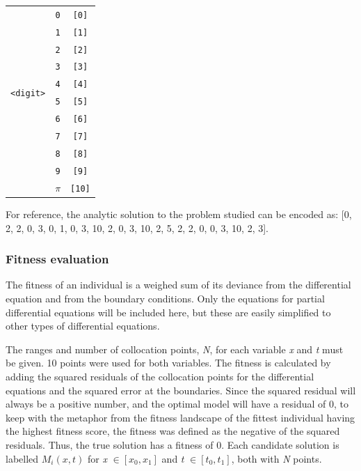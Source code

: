 \documentclass[multicolumn, 9pt]{extarticle}
\begin{document}
\begin{table}[h]
\begin{tabular}{ccc}
		\midrule

		\multirow{10}{*}{\texttt{<digit>}}
		     & \multicolumn{1}{c}{\texttt{0}}                  & \multicolumn{1}{c}{\texttt{[0]}}  \\
		     & \multicolumn{1}{c}{\texttt{1}}                  & \multicolumn{1}{c}{\texttt{[1]}}  \\
		     & \multicolumn{1}{c}{\texttt{2}}                  & \multicolumn{1}{c}{\texttt{[2]}}  \\
		     & \multicolumn{1}{c}{\texttt{3}}                  & \multicolumn{1}{c}{\texttt{[3]}}  \\
		     & \multicolumn{1}{c}{\texttt{4}}                  & \multicolumn{1}{c}{\texttt{[4]}}  \\
		     & \multicolumn{1}{c}{\texttt{5}}                  & \multicolumn{1}{c}{\texttt{[5]}}  \\
		     & \multicolumn{1}{c}{\texttt{6}}                  & \multicolumn{1}{c}{\texttt{[6]}}  \\
		     & \multicolumn{1}{c}{\texttt{7}}                  & \multicolumn{1}{c}{\texttt{[7]}}  \\
		     & \multicolumn{1}{c}{\texttt{8}}                  & \multicolumn{1}{c}{\texttt{[8]}}  \\
		     & \multicolumn{1}{c}{\texttt{9}}                  & \multicolumn{1}{c}{\texttt{[9]}}  \\
		     & \multicolumn{1}{c}{\texttt{$\pi$}}              & \multicolumn{1}{c}{\texttt{[10]}} \\

		\bottomrule
	\end{tabular}
\end{table}


For reference, the analytic solution to the problem studied can be encoded as: [0, 2, 2, 0, 3, 0, 1, 0, 3, 10, 2, 0, 3, 10, 2, 5, 2, 2, 0, 0, 3, 10, 2, 3].

\subsubsection{Fitness evaluation}
The fitness of an individual is a weighed sum of its deviance from the differential equation and from the boundary conditions. Only the equations for partial differential equations will be included here, but these are easily simplified to other types of differential equations.

The ranges and number of collocation points, \textit{N}, for each variable \textit{x} and \textit{t} must be given. 10 points were used for both variables. The fitness is calculated by adding the squared residuals of the collocation points for the differential equations and the squared error at the boundaries. Since the squared residual will always be a positive number, and the optimal model will have a residual of 0, to keep with the metaphor from the fitness landscape of the fittest individual having the highest fitness score, the fitness was defined as the negative of the squared residuals. Thus, the true solution has a fitness of 0. Each candidate solution is labelled $M_{i}(x, t)$ for \textit{x} $\in [x_{0}, x_{1}]$ and \textit{t} $\in [t_{0}, t_{1}]$, both with \textit{N} points.
\end{document}
